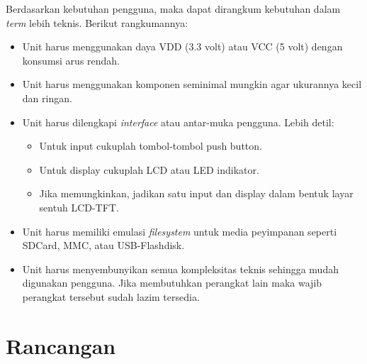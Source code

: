 \documentclass[12pt,]{article}
\begin{document}
	Berdasarkan kebutuhan pengguna, maka dapat dirangkum kebutuhan dalam \textit{term} lebih teknis.
	Berikut rangkumannya:
	\begin{itemize}
		\item Unit harus menggunakan daya VDD (3.3 volt) atau VCC (5 volt) dengan konsumsi arus rendah.

		\item Unit harus menggunakan komponen seminimal mungkin agar ukurannya kecil dan ringan.

		\item Unit harus dilengkapi \textit{interface} atau antar-muka pengguna.
		Lebih detil:
		\begin{itemize}
			\item Untuk input cukuplah tombol-tombol push button.
			\item Untuk display cukuplah LCD atau LED indikator.
			\item Jika memungkinkan, jadikan satu input dan display
			dalam bentuk layar sentuh LCD-TFT.
		\end{itemize}
		\item Unit harus memiliki emulasi \textit{filesystem} untuk media peyimpanan seperti
		SDCard, MMC, atau USB-Flashdisk.
		
		\item Unit harus menyembunyikan semua kompleksitas teknis sehingga mudah digunakan pengguna.
		Jika membutuhkan perangkat lain maka wajib perangkat tersebut sudah lazim tersedia.
		 
	\end{itemize}
	
	\newpage
	\section{Rancangan}
	
\end{document}
